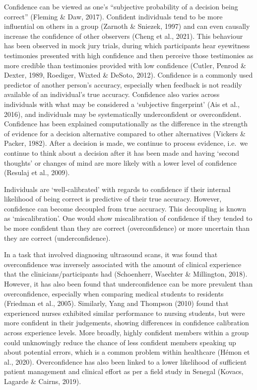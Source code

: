 \documentclass[a4paper, nobind]{templates/ociamthesis}
\begin{document}
Confidence can be viewed as one's ``subjective probability of a decision being correct'' (Fleming \& Daw, 2017). Confident individuals tend to be more influential on others in a group (Zarnoth \& Sniezek, 1997) and can even causally increase the confidence of other observers (Cheng et al., 2021). This behaviour has been observed in mock jury trials, during which participants hear eyewitness testimonies presented with high confidence and then perceive those testimonies as more credible than testimonies provided with low confidence (Cutler, Penrod \& Dexter, 1989, Roediger, Wixted \& DeSoto, 2012). Confidence is a commonly used predictor of another person's accuracy, especially when feedback is not readily available of an individual's true accuracy. Confidence also varies across individuals with what may be considered a `subjective fingerprint' (Ais et al., 2016), and individuals may be systematically underconfident or overconfident. Confidence has been explained computationally as the difference in the strength of evidence for a decision alternative compared to other alternatives (Vickers \& Packer, 1982). After a decision is made, we continue to process evidence, i.e.~we continue to think about a decision after it has been made and having `second thoughts' or changes of mind are more likely with a lower level of confidence (Resulaj et al., 2009).

Individuals are `well-calibrated' with regards to confidence if their internal likelihood of being correct is predictive of their true accuracy. However, confidence can become decoupled from true accuracy. This decoupling is known as `miscalibration'. One would show miscalibration of confidence if they tended to be more confident than they are correct (overconfidence) or more uncertain than they are correct (underconfidence).

In a task that involved diagnosing ultrasound scans, it was found that overconfidence was inversely associated with the amount of clinical experience that the clinicians/participants had (Schoenherr, Waechter \& Millington, 2018). However, it has also been found that underconfidence can be more prevalent than overconfidence, especially when comparing medical students to residents (Friedman et al., 2005). Similarly, Yang and Thompson (2010) found that experienced nurses exhibited similar performance to nursing students, but were more confident in their judgements, showing differences in confidence calibration across experience levels. More broadly, highly confident members within a group could unknowingly reduce the chance of less confident members speaking up about potential errors, which is a common problem within healthcare (Hémon et al., 2020). Overconfidence has also been linked to a lower likelihood of sufficient patient management and clinical effort as per a field study in Senegal (Kovacs, Lagarde \& Cairns, 2019).
\end{document}
